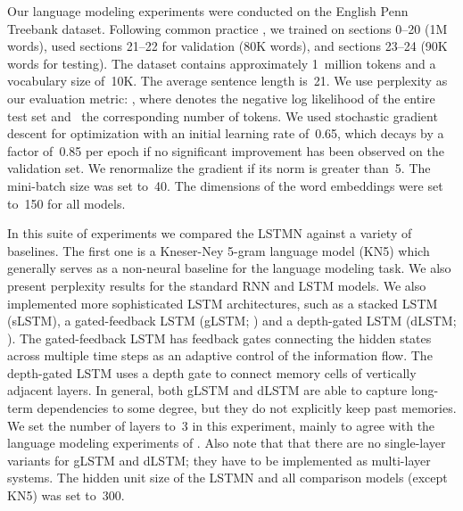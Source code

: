 \documentclass[11pt,letterpaper]{article}
\begin{document}
	
	Our language modeling experiments were conducted on the
        English Penn Treebank dataset. Following common practice
        \cite{mikolov2010recurrent}, we trained on sections 0--20 (1M
        words), used sections 21--22 for validation (80K words), and
        sections 23--24 (90K words for testing). The dataset contains
        approximately 1~million tokens and a vocabulary size
        of~10K. The average sentence length is~21.
We use perplexity as our evaluation metric: \mbox{}, where  denotes the negative log
        likelihood of the entire test set and~ the corresponding
        number of tokens. We used stochastic gradient descent for
        optimization with an initial learning rate of~0.65, which
        decays by a factor of~0.85 per epoch if no significant
        improvement has been observed on the validation set. We
        renormalize the gradient if its norm is greater than~5. The
        \mbox{mini-batch} size was set to~40. The dimensions of the
        word embeddings were set to~150 for all models.


	In this suite of experiments we compared the LSTMN against a
        variety of baselines. The first one is a Kneser-Ney 5-gram
        language model (KN5) which generally serves as a non-neural
        baseline for the language modeling task. We also present
        perplexity results for the standard RNN and LSTM models. We
        also implemented more sophisticated LSTM architectures, such
        as a stacked LSTM (sLSTM), a gated-feedback LSTM (gLSTM;
        ) and a depth-gated LSTM (dLSTM;
        ). The gated-feedback LSTM has feedback
        gates connecting the hidden states across multiple time steps
        as an adaptive control of the information flow. The
        depth-gated LSTM uses a depth gate to connect memory cells of
        vertically adjacent layers. In general, both gLSTM and
        \mbox{dLSTM} are able to capture long-term dependencies to
        some degree, but they do not explicitly keep past memories.
        We set the number of layers to~3 in this experiment, mainly to
        agree with the language modeling experiments of
        . Also note that that there are no
        single-layer variants for gLSTM and dLSTM; they have to
        be implemented as multi-layer systems. The hidden unit size of
        the LSTMN and all comparison models (except KN5) was set
        to~300.
\end{document}
